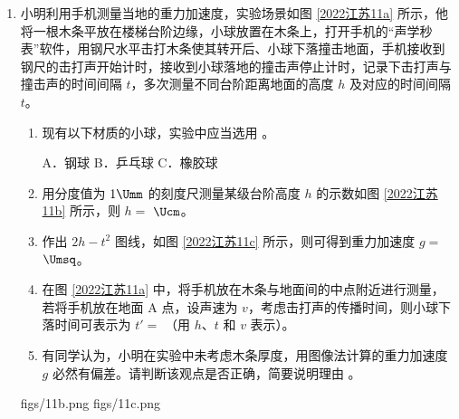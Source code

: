 \documentclass[\gkver]{gaokaozhenti}
\begin{document}
\begin{enumerate}
{	C．根据 B 的分析可知 $\frac{F}{m_\text{A}+m_\text{B}}=-\frac{F_{AB}}{m_\text{B}}$。再结合 B 选项的结论可知下滑过程中 $F$ 向上且逐渐变大，则下滑过程 $F_{AB}$ 逐渐变大，根据牛顿第三定律可知 B 对 A 的压力逐渐变大，故 C 错误；

	D．整个过程中弹力做的功为 0，A 重力做的功为 0，当 A 回到初始位置时速度为零，根据功能关系可知整个过程中 A、B 克服摩擦力所做的总功等于 B 的重力势能减小量，故 D 错误。

	故选 B。
}

\item
小明利用手机测量当地的重力加速度，实验场景如图 \ref{2022江苏11a} 所示，他将一根木条平放在楼梯台阶边缘，小球放置在木条上，打开手机的“声学秒表”软件，用钢尺水平击打木条使其转开后、小球下落撞击地面，手机接收到钢尺的击打声开始计时，接收到小球落地的撞击声停止计时，记录下击打声与撞击声的时间间隔 $t$，多次测量不同台阶距离地面的高度 $h$ 及对应的时间间隔 $t$。
\begin{enumerate}
	\item
	现有以下材质的小球，实验中应当选用 。

	A．钢球 \qquad B．乒乓球 \qquad C．橡胶球
	\item
	用分度值为 $1\Umm$ 的刻度尺测量某级台阶高度 $h$ 的示数如图 \ref{2022江苏11b} 所示，则 $h =$  $\Ucm$。
	\item
	作出 $2h - t^{2}$ 图线，如图 \ref{2022江苏11c} 所示，则可得到重力加速度 $g =$  $\Umsq$。
	\item
	在图 \ref{2022江苏11a} 中，将手机放在木条与地面间的中点附近进行测量，若将手机放在地面 A 点，设声速为 $v$，考虑击打声的传播时间，则小球下落时间可表示为 $t' =$ （用 $h$、$t$ 和 $v$ 表示）。
	\item
	有同学认为，小明在实验中未考虑木条厚度，用图像法计算的重力加速度 $g$ 必然有偏差。请判断该观点是否正确，简要说明理由 。
\end{enumerate}
{figs/11b.png}
{figs/11c.png}

\end{enumerate}
\end{document}
